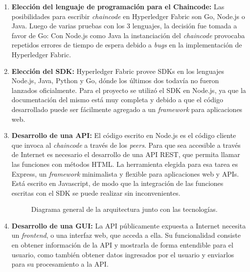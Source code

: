 \begin{enumerate}
    \item \textbf{Elección del lenguaje de programación para el Chaincode: }Las posibilidades para escribir \textit{chaincode} en Hyperledger Fabric son Go, Node.js o Java. Luego de varias pruebas con los 3 lenguajes, la decisión fue tomada a favor de Go: Con Node.js como Java la instanciación del \textit{chaincode} provocaba repetidos errores de tiempo de espera debido a \textit{bugs} en la implementación de Hyperledger Fabric.
    \item \textbf{Elección del SDK: }Hyperledger Fabric provee SDKs en los lenguajes Node.js, Java, Python y Go, dónde los últimos dos todavía no fueron lanzados oficialmente.\cite{hlf_sdks} Para el proyecto se utilizó el SDK en Node.js, ya que la documentación del mismo está muy completa y debido a que el código desarrollado puede ser fácilmente agregado a un \textit{framework} para aplicaciones web.
    \item \textbf{Desarrollo de una API: }El código escrito en Node.js es el código cliente que invoca al \textit{chaincode} a través de los \textit{peers}. Para que sea accesible a través de Internet es necesario el desarrollo de una API REST, que permita llamar las funciones con métodos HTML. La herramienta elegida para esa tarea es Express, un \textit{framework} minimalista y flexible para aplicaciones web y APIs. Está escrito en Javascript, de modo que la integración de las funciones escritas con el SDK se puede realizar sin inconvenientes.
    
    \begin{figure}[H] %
        \caption{Diagrama general de la arquitectura junto con las tecnologías.}
        \label{fig:general_arquitecture}
    \end{figure}
    
    \item \textbf{Desarrollo de una GUI: }La API públicamente expuesta a Internet necesita un \textit{frontend}, o una interfaz web, que acceda a ella. Su funcionalidad consiste en obtener información de la API y mostrarla de forma entendible para el usuario, como también obtener datos ingresados por el usuario y enviarlos para su procesamiento a la API.
    

\end{enumerate}
